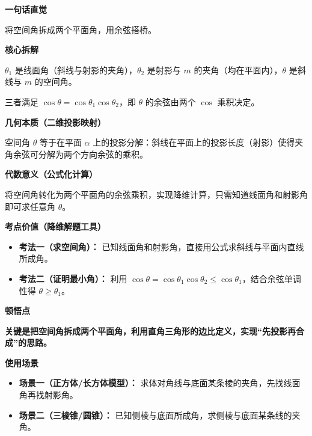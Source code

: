 \begin{explanationbox}
	\textbf{\textcolor{CExplanation}{一句话直觉}}

	将空间角拆成两个平面角，用余弦搭桥。

	\medskip
	\textbf{\textcolor{CExplanation}{核心拆解}}
	\begin{description}[style=nextline, leftmargin=2.8em, labelsep=0.5em, itemsep=0.45em]
		\item[\textbf{要点一（三角度定义）：}] $\theta_1$ 是线面角（斜线与射影的夹角），$\theta_2$ 是射影与 $m$ 的夹角（均在平面内），$\theta$ 是斜线与 $m$ 的空间角。
		\item[\textbf{要点二（余弦乘积关系）：}] 三者满足 $\cos\theta = \cos\theta_1\cos\theta_2$，即 $\theta$ 的余弦由两个 $\cos$ 乘积决定。
	\end{description}

	\medskip
	\textbf{\textcolor{CExplanation}{几何本质（二维投影映射）}}

	空间角 $\theta$ 等于在平面 $\alpha$ 上的投影分解：斜线在平面上的投影长度（射影）使得夹角余弦可分解为两个方向余弦的乘积。

	\medskip
	\textbf{\textcolor{CExplanation}{代数意义（公式化计算）}}

	将空间角转化为两个平面角的余弦乘积，实现降维计算，只需知道线面角和射影角即可求任意角 $\theta$。

	\medskip
	\textbf{\textcolor{CExplanation}{考点价值（降维解题工具）}}
	\begin{itemize}[leftmargin=*, itemsep=0.5em, topsep=0.4em]
		\item \textbf{考法一（求空间角）：} 已知线面角和射影角，直接用公式求斜线与平面内直线所成角。
		\item \textbf{考法二（证明最小角）：} 利用 $\cos\theta = \cos\theta_1\cos\theta_2 \le \cos\theta_1$，结合余弦单调性得 $\theta \ge \theta_1$。
	\end{itemize}

	\medskip
	\textbf{\textcolor{CExplanation}{顿悟点}}

	\textbf{关键是把空间角拆成两个平面角，利用直角三角形的边比定义，实现“先投影再合成”的思路。}

	\medskip
	\textbf{\textcolor{CExplanation}{使用场景}}
	\begin{itemize}[leftmargin=*, itemsep=0.5em, topsep=0.4em]
		\item \textbf{场景一（正方体/长方体模型）：} 求体对角线与底面某条棱的夹角，先找线面角再找射影角。
		\item \textbf{场景二（三棱锥/圆锥）：} 已知侧棱与底面所成角，求侧棱与底面某条线的夹角。
	\end{itemize}
\end{explanationbox}
